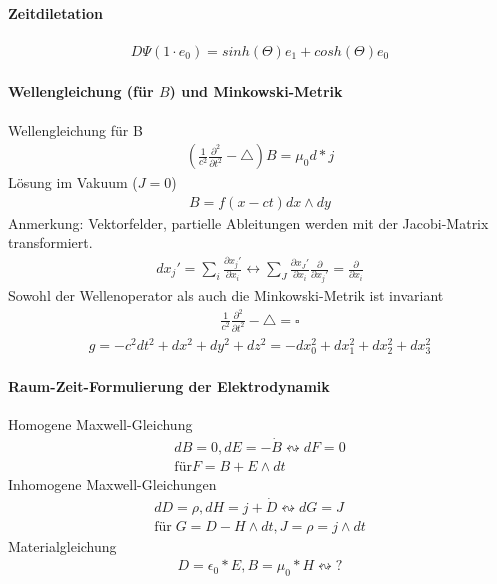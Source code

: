 \documentclass[10pt,a4paper]{article}
\begin{document}
\paragraph{Zeitdiletation} $\,$ \\
\begin{align}
D \Psi (1 \cdot e_0) =sinh( \Theta) e_1  +  cosh(\Theta) e_0
\end{align}
\paragraph{Wellengleichung (für $B$) und Minkowski-Metrik} $\,$ \\
Wellengleichung für B
\begin{align}
(\frac{1}{c^2} \frac{\partial^2}{\partial t^2}- \triangle ) B= \mu_0 d * j
\end{align}
Lösung im Vakuum ($J=0$)
\begin{align}
B=f(x-ct) dx \wedge dy
\end{align}
Anmerkung: Vektorfelder, partielle Ableitungen werden mit der Jacobi-Matrix transformiert.
\begin{align}
dx_j' = \sum_i \frac{\partial x_j'}{\partial x_i} \leftrightarrow \sum_J \frac{\partial x_J'}{\partial x_i} \frac{\partial}{\partial x_j'} = \frac{\partial }{\partial x_i}
\end{align}
Sowohl der Wellenoperator als auch die Minkowski-Metrik ist invariant
\begin{align}
\frac{1}{c^2} \frac{\partial^2}{\partial t^2}- \triangle = \square
\end{align}
\begin{align}
g= -c^2dt^2+dx^2+dy^2+dz^2=-dx_0^2+dx_1^2+dx_2^2+dx_3^2
\end{align}
\paragraph{Raum-Zeit-Formulierung der Elektrodynamik} $\,$ \\
Homogene Maxwell-Gleichung
\begin{align}
dB=0, dE= -\dot{B} \leftrightsquigarrow dF=0 \\ \text{für} F= B+E \wedge dt
\end{align}
Inhomogene Maxwell-Gleichungen
\begin{align}
dD= \rho , dH= j + \dot{D} \leftrightsquigarrow dG =J \\ \text{für} \; G= D-H \wedge dt , J= \rho =j \wedge dt
\end{align}
Materialgleichung
\begin{align}
D=\epsilon_0 * E, B= \mu_0 * H \leftrightsquigarrow ?
\end{align}
\end{document}
